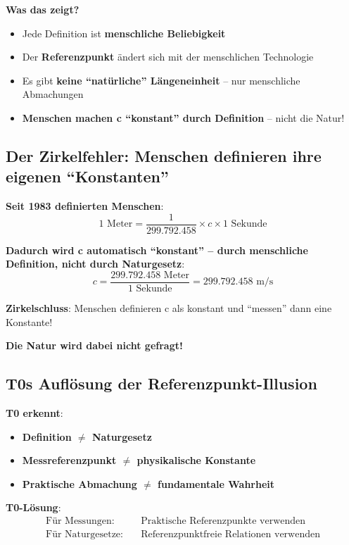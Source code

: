 	\textbf{Was das zeigt?}
	\begin{itemize}
		\item Jede Definition ist \textbf{menschliche Beliebigkeit}
		\item Der \textbf{Referenzpunkt} ändert sich mit der menschlichen Technologie
		\item Es gibt \textbf{keine ``natürliche'' Längeneinheit} – nur menschliche Abmachungen
		\item \textbf{Menschen machen c ``konstant'' durch Definition} – nicht die Natur!
	\end{itemize}
	
	\subsection{Der Zirkelfehler: Menschen definieren ihre eigenen ``Konstanten''}
	
	\textbf{Seit 1983 definierten Menschen}:
	\begin{equation}
		1 \text{ Meter} = \frac{1}{299.792.458} \times c \times 1 \text{ Sekunde}
	\end{equation}
	
	\textbf{Dadurch wird c automatisch ``konstant'' – durch menschliche Definition, nicht durch Naturgesetz}:
	\begin{equation}
		c = \frac{299.792.458 \text{ Meter}}{1 \text{ Sekunde}} = 299.792.458 \text{ m/s}
	\end{equation}
	
	\textbf{Zirkelschluss}: Menschen definieren c als konstant und ``messen'' dann eine Konstante!
	
	\textbf{Die Natur wird dabei nicht gefragt!}
	
	\subsection{T0s Auflösung der Referenzpunkt-Illusion}
	
	\textbf{T0 erkennt}:
	\begin{itemize}
		\item \textbf{Definition $\neq$ Naturgesetz}
		\item \textbf{Messreferenzpunkt $\neq$ physikalische Konstante}
		\item \textbf{Praktische Abmachung $\neq$ fundamentale Wahrheit}
	\end{itemize}
	
	\textbf{T0-Lösung}:
	\begin{align}
		\text{Für Messungen:} \quad &\text{Praktische Referenzpunkte verwenden} \\
		\text{Für Naturgesetze:} \quad &\text{Referenzpunktfreie Relationen verwenden}
	\end{align}
	
